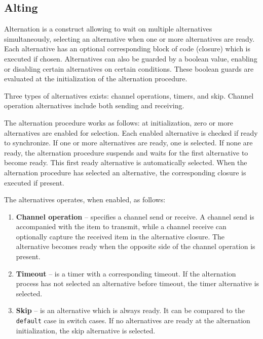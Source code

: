 \subsection{Alting}


Alternation is a construct allowing to wait on multiple alternatives simultaneously, selecting an alternative when one or more alternatives are ready. Each alternative has an optional corresponding block of code (closure) which is executed if chosen. Alternatives can also be guarded by a boolean value, enabling or disabling certain alternatives on certain conditions. These boolean guards are evaluated at the initialization of the alternation procedure.

Three types of alternatives exists: channel operations, timers, and skip. Channel operation alternatives include both sending and receiving.

The alternation procedure works as follows: at initialization, zero or more alternatives are enabled for selection. Each enabled alternative is checked if ready to synchronize. If one or more alternatives are ready, one is selected. If none are ready, the alternation procedure suspends and waits for the first alternative to become ready. This first ready alternative is automatically selected. When the alternation procedure has selected an alternative, the corresponding closure is executed if present.

The alternatives operates, when enabled, as follows:

\begin{enumerate}[topsep=0em,itemsep=-1em,partopsep=0.5em,parsep=1em]
    \item \textbf{Channel operation} -- specifies a channel send or receive. A channel send is accompanied with the item to transmit, while a channel receive can optionally capture the received item in the alternative closure. The alternative becomes ready when the opposite side of the channel operation is present.
    \item \textbf{Timeout} -- is a timer with a corresponding timeout. If the alternation process has not selected an alternative before timeout, the timer alternative is selected.
    \item \textbf{Skip} -- is an alternative which is always ready. It can be compared to the \texttt{default} case in switch cases. If no alternatives are ready at the alternation initialization, the skip alternative is selected. 
\end{enumerate}

